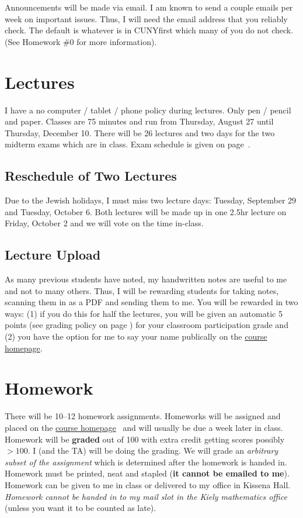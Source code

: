 \documentclass[12pt]{article}
\newcommand{\coursewebpage}{\href{https://github.com/kapelner/QC_Math_241_Fall_2015}{course homepage}}
\begin{document}
Announcements will be made via email. I am known to send a couple emails per week on important issues. Thus, I will need the email address that you reliably check. The default is whatever is in CUNYfirst which many of you do not check. (See Homework \#0 for more information).

\section*{Lectures}

I have a no computer / tablet / phone policy during lectures. Only pen / pencil and paper. Classes are 75 minutes and run from Thursday, August 27 until Thursday, December 10. There will be 26 lectures and two days for the two midterm exams which are in class. Exam schedule is given on page~\pageref{subsec:exam_schedule}.

\subsection*{Reschedule of Two Lectures}

Due to the Jewish holidays, I must miss two lecture days: Tuesday, September 29 and Tuesday, October 6. Both lectures will be made up in one 2.5hr lecture on Friday, October 2 and we will vote on the time in-class.

\subsection*{Lecture Upload}

As many previous students have noted, my handwritten notes are useful to me and not to many others. Thus, I will be rewarding students for taking notes, scanning them in as a PDF and sending them to me. You will be rewarded in two ways: (1) if you do this for half the lectures, you will be given an automatic 5 points (see grading policy on page \pageref{sec:grading}) for your classroom participation grade and (2) you have the option for me to say your name publically on the \coursewebpage.

\section*{Homework}

There will be 10--12 homework assignments. Homeworks will be assigned and placed on the \coursewebpage~ and will usually be due a week later in class. Homework will be \textbf{graded} out of 100 with extra credit getting scores possibly $> 100$. I (and the TA) will be doing the grading. We will grade an \textit{arbitrary subset of the assignment} which is determined after the homework is handed in. Homework must be printed, neat and stapled (\textbf{it cannot be emailed to me}). Homework can be given to me in class or delivered to my office in Kissena Hall. \textit{Homework cannot be handed in to my mail slot in the Kiely mathematics office} (unless you want it to be counted as late).
\end{document}
